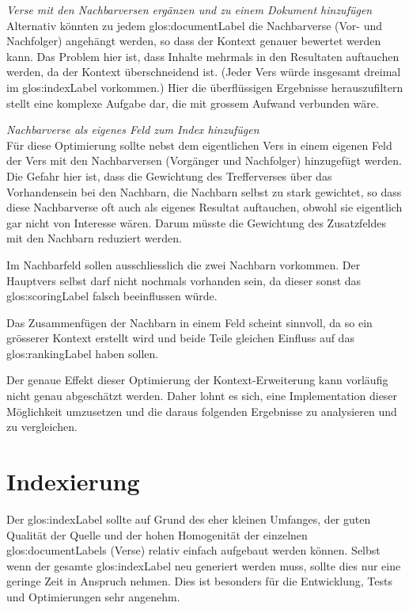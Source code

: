 \vspace{0.5em}
\textit{Verse mit den Nachbarversen ergänzen und zu einem Dokument hinzufügen}
\vspace{0.5em}\\
Alternativ könnten zu jedem \gls{glos:documentLabel} die Nachbarverse (Vor- und Nachfolger) angehängt werden, so dass der Kontext genauer bewertet werden kann.
Das Problem hier ist, dass Inhalte mehrmals in den Resultaten auftauchen werden, da der Kontext überschneidend ist. (Jeder Vers würde insgesamt dreimal im \gls{glos:indexLabel} vorkommen.)
Hier die überflüssigen Ergebnisse herauszufiltern stellt eine komplexe Aufgabe dar, die mit grossem Aufwand verbunden wäre.

\vspace{0.5em}
\textit{Nachbarverse als eigenes Feld zum Index hinzufügen}
\vspace{0.5em}\\
Für diese Optimierung sollte nebst dem eigentlichen Vers in einem eigenen Feld der Vers mit den Nachbarversen (Vorgänger und Nachfolger) hinzugefügt werden.
Die Gefahr hier ist, dass die Gewichtung des Trefferverses über das Vorhandensein bei den Nachbarn, die Nachbarn selbst zu stark gewichtet, so dass diese Nachbarverse oft auch als eigenes Resultat auftauchen, obwohl sie eigentlich gar nicht von Interesse wären. Darum müsste die Gewichtung des Zusatzfeldes mit den Nachbarn reduziert werden.

Im Nachbarfeld sollen ausschliesslich die zwei Nachbarn vorkommen. Der Hauptvers selbst darf nicht nochmals vorhanden sein, da dieser sonst das \gls{glos:scoringLabel} falsch beeinflussen würde.

Das Zusammenfügen der Nachbarn in einem Feld scheint sinnvoll, da so ein grösserer Kontext erstellt wird und beide Teile gleichen Einfluss auf das \gls{glos:rankingLabel} haben sollen.

Der genaue Effekt dieser Optimierung der Kontext-Erweiterung kann vorläufig nicht genau abgeschätzt werden.
Daher lohnt es sich, eine Implementation dieser Möglichkeit umzusetzen und die daraus folgenden Ergebnisse zu analysieren und zu vergleichen.


\section{Indexierung}
\label{sec:indexing}
Der \gls{glos:indexLabel} sollte auf Grund des eher kleinen Umfanges, der guten Qualität der Quelle und der hohen Homogenität der einzelnen \glspl{glos:documentLabel} (Verse) relativ einfach aufgebaut werden können.
Selbst wenn der gesamte \gls{glos:indexLabel} neu generiert werden muss, sollte dies nur eine geringe Zeit in Anspruch nehmen.
Dies ist besonders für die Entwicklung, Tests und Optimierungen sehr angenehm.

